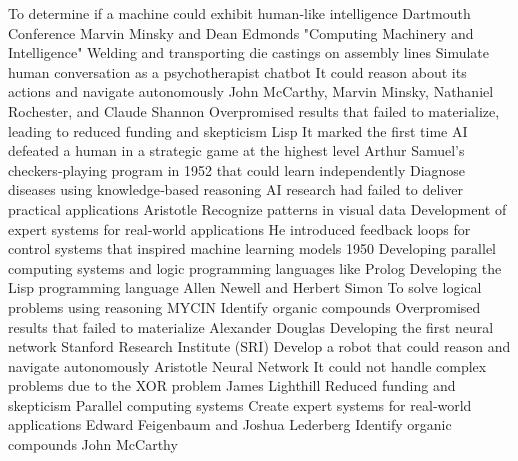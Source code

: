 \answerkey
{} To determine if a machine could exhibit human‑like intelligence
 Dartmouth Conference
 Marvin Minsky and Dean Edmonds
 "Computing Machinery and Intelligence"
 Welding and transporting die castings on assembly lines
 Simulate human conversation as a psychotherapist chatbot
 It could reason about its actions and navigate autonomously
 John McCarthy, Marvin Minsky, Nathaniel Rochester, and Claude Shannon
 Overpromised results that failed to materialize, leading to reduced funding and skepticism
 Lisp
 It marked the first time AI defeated a human in a strategic game at the highest level
 Arthur Samuel's checkers‑playing program in 1952 that could learn independently
 Diagnose diseases using knowledge‑based reasoning
 AI research had failed to deliver practical applications
 Aristotle
 Recognize patterns in visual data
 Development of expert systems for real‑world applications
 He introduced feedback loops for control systems that inspired machine learning models
 1950
 Developing parallel computing systems and logic programming languages like Prolog
 Developing the Lisp programming language
 Allen Newell and Herbert Simon
 To solve logical problems using reasoning
 MYCIN
 Identify organic compounds
 Overpromised results that failed to materialize
 Alexander Douglas
 Developing the first neural network
 Stanford Research Institute (SRI)
 Develop a robot that could reason and navigate autonomously
 Aristotle
 Neural Network
 It could not handle complex problems due to the XOR problem
 James Lighthill
 Reduced funding and skepticism
 Parallel computing systems
 Create expert systems for real‑world applications
 Edward Feigenbaum and Joshua Lederberg
 Identify organic compounds
 John McCarthy
\endanswerkey